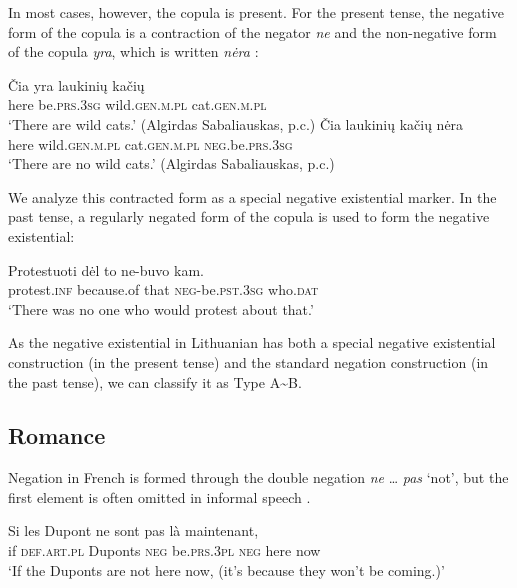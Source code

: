 \documentclass[output=paper,colorlinks,citecolor=brown]{langscibook}
\begin{document}
\begin{paperappendix}
\begin{unindented}
In most cases, however, the copula is present. For the present tense, the negative form of the copula is a contraction of the negator \textit{ne} and the non-negative form of the copula \textit{yra}, which is written \textit{nėra} \citep[1976]{Mathiassen1996}:
%
\begin{exe}\ex \gll Čia yra laukinių kačių \\
here be.\textsc{prs.3sg} wild.\textsc{gen.m.pl} cat.\textsc{gen.m.pl} \\
    \glt `There are wild cats.' (Algirdas Sabaliauskas, p.c.)
\ex \gll Čia laukinių kačių nėra \\
here  wild.\textsc{gen.m.pl} cat.\textsc{gen.m.pl} \textsc{neg}.be.\textsc{prs.3sg} \\
    \glt `There are no wild cats.' (Algirdas Sabaliauskas, p.c.)
    \end{exe}

We analyze this contracted form as a special negative existential marker. In the past tense, a regularly negated form of the copula is used to form the negative existential:
%
\begin{exe}\ex \gll Protestuoti dėl to ne-buvo kam. \\
protest.\textsc{inf} because.of that \textsc{neg}-be.\textsc{pst.3sg} who.\textsc{dat} \\
    \glt `There was no one who would protest about that.' \parencite[134]{Kaledaite2008}
    \end{exe}

As the negative existential in Lithuanian has both a special negative existential construction (in the present tense) and the standard negation construction (in the past tense), we can classify it as Type A{\textasciitilde}B.

\subsection{Romance}%


Negation in French is formed through the double negation \textit{ne} …
\textit{pas} `not', but the first element is often omitted in informal
speech \parencite[219]{LangPerez2004}.
%
\begin{exe}\ex \gll Si les Dupont ne sont pas là maintenant, \\
if  \textsc{def.art.pl} Duponts \textsc{neg} be.\textsc{prs.3pl} \textsc{neg} here now \\
    \glt `If the Duponts are not here now, (it's because they won't be coming.)’ \parencite[219]{LangPerez2004}
    \end{exe}


\end{unindented}
\end{paperappendix}
\end{document}
